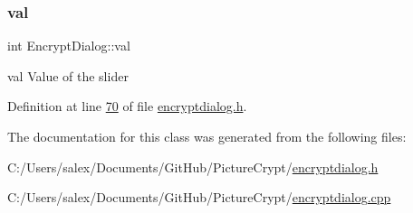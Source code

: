 \mbox{\label{class_encrypt_dialog_a3c9da51b5e9d98d702bcc4ed15405fd5}} 
\subsubsection{\texorpdfstring{val}{val}}
{\footnotesize\ttfamily int Encrypt\+Dialog\+::val}



val Value of the slider 



Definition at line \mbox{\hyperlink{encryptdialog_8h_source_l00070}{70}} of file \mbox{\hyperlink{encryptdialog_8h_source}{encryptdialog.\+h}}.



The documentation for this class was generated from the following files\+:\begin{DoxyCompactItemize}
\item 
C\+:/\+Users/salex/\+Documents/\+Git\+Hub/\+Picture\+Crypt/\mbox{\hyperlink{encryptdialog_8h}{encryptdialog.\+h}}\item 
C\+:/\+Users/salex/\+Documents/\+Git\+Hub/\+Picture\+Crypt/\mbox{\hyperlink{encryptdialog_8cpp}{encryptdialog.\+cpp}}\end{DoxyCompactItemize}
